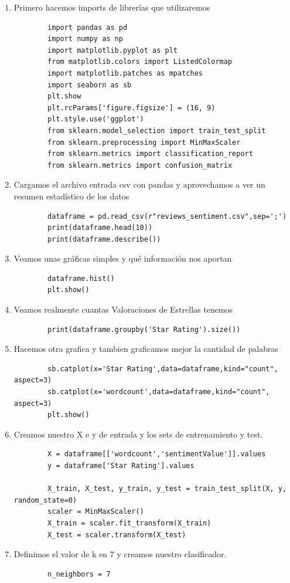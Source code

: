 \documentclass{article}
\begin{document}
\begin{enumerate}
    \item Primero hacemos imports de librerías que utilizaremos
    \begin{verbatim}
        import pandas as pd
        import numpy as np
        import matplotlib.pyplot as plt
        from matplotlib.colors import ListedColormap
        import matplotlib.patches as mpatches
        import seaborn as sb
        plt.show
        plt.rcParams['figure.figsize'] = (16, 9)
        plt.style.use('ggplot')
        from sklearn.model_selection import train_test_split
        from sklearn.preprocessing import MinMaxScaler
        from sklearn.metrics import classification_report
        from sklearn.metrics import confusion_matrix
    \end{verbatim}
    \item Cargamos el archivo entrada csv con pandas y aprovechamos a ver un resumen estadístico de los datos
    \begin{verbatim}
        dataframe = pd.read_csv(r"reviews_sentiment.csv",sep=';')
        print(dataframe.head(10))
        print(dataframe.describe())
    \end{verbatim}
    \item Veamos unas gráficas simples y qué información nos aportan
    \begin{verbatim}
        dataframe.hist()
        plt.show()
    \end{verbatim}
    \item Veamos realmente cuantas Valoraciones de Estrellas tenemos
    \begin{verbatim}
        print(dataframe.groupby('Star Rating').size())
    \end{verbatim}
    \item Hacemos otra grafica y tambien graficamos mejor la cantidad de palabras
    \begin{verbatim}
        sb.catplot(x='Star Rating',data=dataframe,kind="count", aspect=3)
        sb.catplot(x='wordcount',data=dataframe,kind="count", aspect=3)
        plt.show()
    \end{verbatim}
    \item Creamos nuestro X e y de entrada y los sets de entrenamiento y test.
    \begin{verbatim}
        X = dataframe[['wordcount','sentimentValue']].values
        y = dataframe['Star Rating'].values

        X_train, X_test, y_train, y_test = train_test_split(X, y, random_state=0)
        scaler = MinMaxScaler()
        X_train = scaler.fit_transform(X_train)
        X_test = scaler.transform(X_test)
    \end{verbatim}    
    \item Definimos el valor de k en 7 y creamos nuestro clasificador.
    \begin{verbatim}
        n_neighbors = 7


\end{verbatim}
\end{enumerate}
\end{document}
